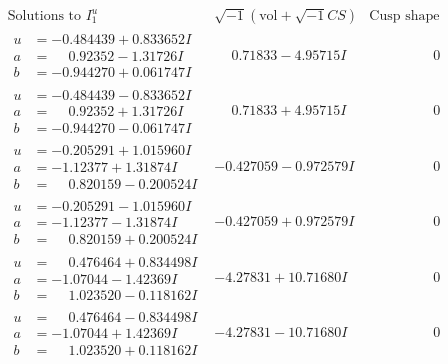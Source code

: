 \documentclass[1p]{elsarticle_modified}
\theoremstyle{definition}
\newcommand{\I}{\sqrt{-1}}
\begin{document}
$$\begin{array}{c|c|c}  
\text{Solutions to }I^u_{1}& \I (\text{vol} + \sqrt{-1}CS) & \text{Cusp shape}\\
 \hline 
\begin{aligned}
u &= -0.484439 + 0.833652 I \\
a &= \phantom{-}0.92352 - 1.31726 I \\
b &= -0.944270 + 0.061747 I\end{aligned}
 & \phantom{-}0.71833 - 4.95715 I & \phantom{-0.000000 } 0 \\ \hline\begin{aligned}
u &= -0.484439 - 0.833652 I \\
a &= \phantom{-}0.92352 + 1.31726 I \\
b &= -0.944270 - 0.061747 I\end{aligned}
 & \phantom{-}0.71833 + 4.95715 I & \phantom{-0.000000 } 0 \\ \hline\begin{aligned}
u &= -0.205291 + 1.015960 I \\
a &= -1.12377 + 1.31874 I \\
b &= \phantom{-}0.820159 - 0.200524 I\end{aligned}
 & -0.427059 - 0.972579 I & \phantom{-0.000000 } 0 \\ \hline\begin{aligned}
u &= -0.205291 - 1.015960 I \\
a &= -1.12377 - 1.31874 I \\
b &= \phantom{-}0.820159 + 0.200524 I\end{aligned}
 & -0.427059 + 0.972579 I & \phantom{-0.000000 } 0 \\ \hline\begin{aligned}
u &= \phantom{-}0.476464 + 0.834498 I \\
a &= -1.07044 - 1.42369 I \\
b &= \phantom{-}1.023520 - 0.118162 I\end{aligned}
 & -4.27831 + 10.71680 I & \phantom{-0.000000 } 0 \\ \hline\begin{aligned}
u &= \phantom{-}0.476464 - 0.834498 I \\
a &= -1.07044 + 1.42369 I \\
b &= \phantom{-}1.023520 + 0.118162 I\end{aligned}
 & -4.27831 - 10.71680 I & \phantom{-0.000000 } 0 \\ \hline\begin{aligned}

\end{aligned}
\end{array}$$
\end{document}
